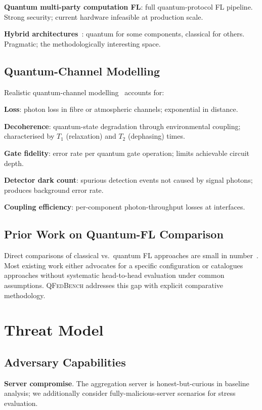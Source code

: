 \documentclass[sigconf,nonacm]{acmart}
\begin{document}
\textbf{Quantum multi-party computation FL}: full
quantum-protocol FL pipeline. Strong security; current hardware
infeasible at production scale.

\textbf{Hybrid architectures}~\cite{li2024hybridqfl}: quantum
for some components, classical for others. Pragmatic; the
methodologically interesting space.

\subsection{Quantum-Channel Modelling}

Realistic quantum-channel modelling~\cite{wolf2024qchannel,
khatri2024qcomm} accounts for:

\textbf{Loss}: photon loss in fibre or atmospheric channels;
exponential in distance.

\textbf{Decoherence}: quantum-state degradation through
environmental coupling; characterised by $T_1$ (relaxation)
and $T_2$ (dephasing) times.

\textbf{Gate fidelity}: error rate per quantum gate operation;
limits achievable circuit depth.

\textbf{Detector dark count}: spurious detection events not
caused by signal photons; produces background error rate.

\textbf{Coupling efficiency}: per-component photon-throughput
losses at interfaces.

\subsection{Prior Work on Quantum-FL Comparison}

Direct comparisons of classical vs.\ quantum FL approaches are
small in number~\cite{huang2024qfedsurv,li2024hybridqfl}. Most
existing work either advocates for a specific configuration or
catalogues approaches without systematic head-to-head evaluation
under common assumptions. \textsc{QFedBench} addresses this gap
with explicit comparative methodology.

\section{Threat Model}

\subsection{Adversary Capabilities}

\textbf{Server compromise}. The aggregation server is
honest-but-curious in baseline analysis; we additionally consider
fully-malicious-server scenarios for stress evaluation.
\end{document}
